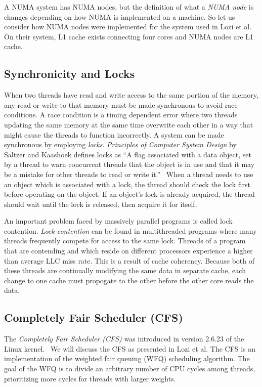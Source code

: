 \documentclass{sig-alternate}
\begin{document}
A NUMA system has NUMA nodes, but the definition of what a \emph{NUMA node} is changes depending on how NUMA is implemented on a machine. So let us consider how NUMA nodes were implemented for the system used in Lozi et al. On their system, L1 cache exists connecting four cores and NUMA nodes are L1 cache.

\subsection{Synchronicity and Locks}
\label{sec:locks}

When two threads have read and write access to the same portion of the memory, any read or write to that memory must be made synchronous to avoid race conditions. A race condition is a timing dependent error where two threads updating the same memory at the same time overwrite each other in a way that might cause the threads to function incorrectly. A system can be made synchronous by employing \emph{locks}. \textit{Principles of Computer System Design} by Saltzer and Kaashoek defines locks as ``A flag associated with a data object, set by a thread to warn concurrent threads that the object is in use and that it may be a mistake for other threads to read or write it.''~\cite{Systems}
When a thread needs to use an object which is associated with a lock, the thread should check the lock first before operating on the object. If an object's lock is already acquired, the thread should wait until the lock is released, then acquire it for itself.

An important problem faced by massively parallel programs is called lock contention. \emph{Lock contention} can be found in multithreaded programs where many threads frequently compete for access to the same lock. Threads of a program that are contending and which reside on different processors experience a higher than average LLC miss rate. This is a result of cache coherency. Because both of these threads are continually modifying the same data in separate cache, each change to one cache must propogate to the other before the other core reads the data.


\subsection{Completely Fair Scheduler (CFS)}
\label{sec:cfs}

The \emph{Completely Fair Scheduler (CFS)} was introduced in version 2.6.23 of the Linux kernel.~\cite{Jo:2017} We will discuss the CFS as presented in Lozi et al. The CFS is an implementation of the weighted fair queuing (WFQ) scheduling algorithm. The goal of the WFQ is to divide an arbitrary number of CPU cycles among threads, prioritizing more cycles for threads with larger weights.~\cite{Lozi:2016}
\end{document}
